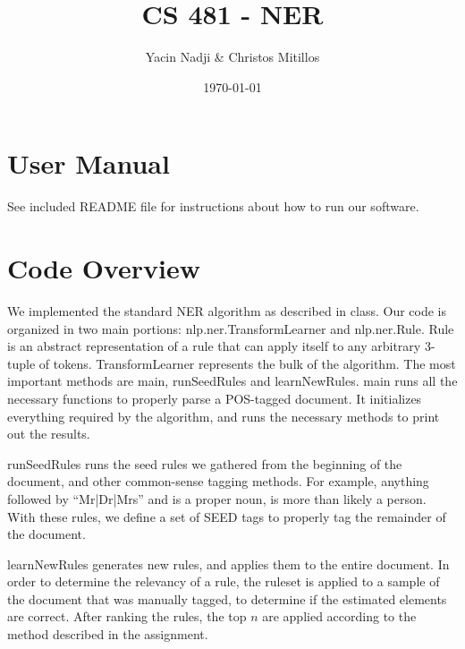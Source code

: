 \documentclass[titlepage]{article}
\title{CS 481 - NER}
\author{Yacin Nadji \& Christos Mitillos}
\date{\today}
\begin{document}
\maketitle

	\section{User Manual}\label{sec:user_manual}
	See included README file for instructions about how to run our software.
	
	\section{Code Overview}\label{sec:code_overview}
	We implemented the standard NER algorithm as described in class. Our code is organized in two main portions: nlp.ner.TransformLearner and nlp.ner.Rule. Rule is an abstract representation of a rule that can apply itself to any arbitrary 3-tuple of tokens. TransformLearner represents the bulk of the algorithm. The most important methods are main, runSeedRules and learnNewRules. main runs all the necessary functions to properly parse a POS-tagged document. It initializes everything required by the algorithm, and runs the necessary methods to print out the results.
	
	runSeedRules runs the seed rules we gathered from the beginning of the document, and other common-sense tagging methods. For example, anything followed by ``Mr|Dr|Mrs'' and is a proper noun, is more than likely a person. With these rules, we define a set of SEED tags to properly tag the remainder of the document.
	
	learnNewRules generates new rules, and applies them to the entire document. In order to determine the relevancy of a rule, the ruleset is applied to a sample of the document that was manually tagged, to determine if the estimated elements are correct. After ranking the rules, the top $n$ are applied according to the method described in the assignment.
	
\end{document}
